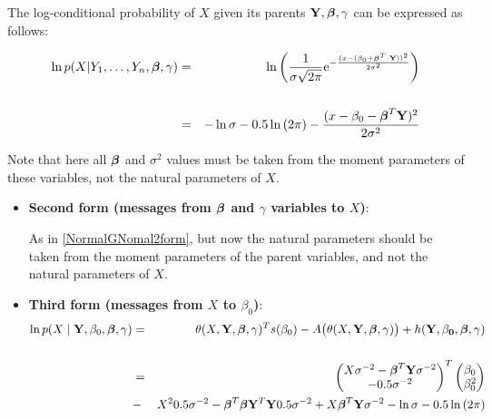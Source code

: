 \documentclass[11pt, oneside]{article}   	%
\newcommand{\bm}{\mathbf}
\newcommand{\bs}{\boldsymbol}
\newcommand{\me}{\mathrm{e}}
\numberwithin{figure}{section}
\numberwithin{equation}{section}
\numberwithin{table}{section}
\theoremstyle{definition}
\begin{document}
\begin{appendices}
The log-conditional probability of $X$ given its parents $\mathbf{Y}, \beb, \gamma$ can be expressed as follows:

\begin{eqnarray*}
\ln p(X|Y_1,\ldots,Y_n,\beb,\gamma) &=& \ln \left(\frac{1}{\sigma \sqrt{2\pi}} \me^{-\frac{(x-(\beta_0+ \bs \beta^T \cdot \bm Y))^2}{2\sigma^2}} \right)\\\\
&=&
- \ln{\sigma} - 0.5\ln{(2\pi)} - \frac{(x-\beta_0 - \bs \beta^T \mathbf{Y})^2}{2\sigma^2}
\end{eqnarray*}


Note that here all $\beb$ and $\sigma^2$ values must be taken from the moment parameters of these variables, not the natural parameters of $X$.

\begin{itemize} 

\item \textbf{Second form (messages from $\beb$ and $\gamma$ variables to $X$)}:

As in \ref{NormalGNomal2form}, but now the natural parameters should be taken from the moment parameters of the parent variables, and not the natural parameters of $X$.

\item \textbf{Third form (messages from $X$ to $\beta_0$)}:
\begin{eqnarray*}
\ln p(X\mid \mathbf{Y},\beta_0,\beb,\gamma) &=& \theta(X,\Y,\beb,\gamma)^T s(\beta_0) - A \big(\theta(X,\Y,\beb,\gamma) \big) + h(\mathbf{Y,\beta_0,\beb,\gamma})\\\\
&=&
\begin{pmatrix}
X\sigma^{-2} - \beb^T \Y \sigma^{-2} \\
-0.5\sigma^{-2}
\end{pmatrix}^T
\begin{pmatrix}
\beta_0\\
\beta_0^2\\
\end{pmatrix}\\
&-& X^2 0.5\sigma^{-2} - \beb^T \beb \Y^T \Y 0.5\sigma^{-2}  + X\beb^T \Y \sigma^{-2} - \ln{\sigma} - 0.5\ln{(2\pi)}
\end{eqnarray*}



\end{itemize}
\end{appendices}
\end{document}
